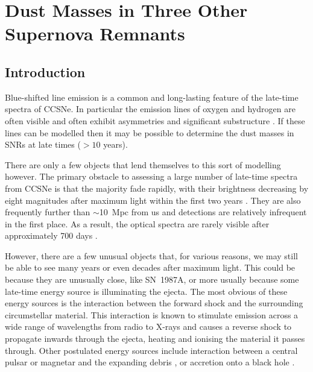 \chapter[Dust Masses in Three Other Supernova Remnants]{Dust Masses in Three Other \\ Supernova Remnants}\label{chp:chp6}

%
%

\section{Introduction}

Blue-shifted line emission is a common and long-lasting feature of the late-time spectra of CCSNe.  In particular the emission lines of oxygen and hydrogen are often visible and often exhibit asymmetries and significant substructure \citep{Milisavljevic2012}.  If these lines can be modelled then it may be possible to determine the dust masses in SNRs at late times ($>10$ years).

There are only a few objects that lend themselves to this sort of modelling however.  The primary obstacle to assessing a large number of late-time spectra from CCSNe is that the majority fade rapidly,  with their brightness decreasing by eight magnitudes after maximum light within the first two years \citep{Kirshner1990}.  They are also frequently further than $\sim$10~Mpc from us and detections are relatively infrequent in the first place.  As a result, the optical spectra are rarely visible after approximately 700 days \citep{Milisavljevic2012}.  

However, there are a few unusual objects that, for various reasons, we may still be able to see many years or even decades after maximum light.  This could be because they are unusually close, like SN~1987A, or more usually because some late-time energy source is illuminating the ejecta.  The most obvious of these energy sources is the interaction between the forward shock and the surrounding circumstellar material.  This interaction is known to stimulate emission across a wide range of wavelengths from radio to X-rays and causes a reverse shock to propagate inwards through the ejecta, heating and ionising the material it passes through.  Other postulated energy sources include interaction between a central pulsar or magnetar and the expanding debris \citep{Woosley2010}, or accretion onto a black hole \citep{Patnaude2001}.

